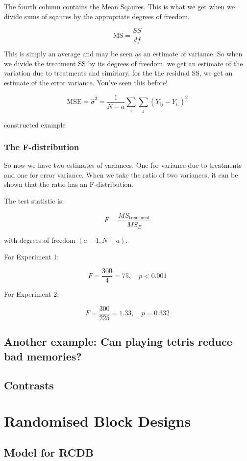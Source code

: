 \documentclass[
  letterpaper,
  DIV=11,
  numbers=noendperiod,
  oneside]{scrreprt}
\begin{document}
The fourth column contains the Mean Sqaures. This is what we get when we
divide sums of sqaures by the appropriate degrees of freedom.

\[ \text{MS} = \frac{SS}{df}\]

This is simply an average and may be seen as an estimate of variance. So
when we divide the treatment SS by its degrees of freedom, we get an
estimate of the variation due to treatments and simirlary, for the the
residual SS, we get an estimate of the error variance. You've seen this
before!

\[\text{MSE} = \hat{\sigma}^2 = \frac{1}{N-a}\sum_i\sum_j(Y_{ij} - Y_{i.})^2\]

constructed example

\section{The F-distribution}\label{the-f-distribution}

So now we have two estimates of variances. One for variance due to
treatments and one for error variance. When we take the ratio of two
variances, it can be shown that the ratio has an F-distribution.

The test statistic is:

\[
F = \frac{MS_{\text{treatment}}}{MS_E}
\]

with degrees of freedom \((a-1, N-a)\).

For Experiment 1:

\[
F = \frac{300}{4} = 75, \quad p < 0.001
\]

For Experiment 2:

\[
F = \frac{300}{225} = 1.33, \quad p = 0.332
\]

\chapter{Another example: Can playing tetris reduce bad
memories?}\label{another-example-can-playing-tetris-reduce-bad-memories}

\chapter{Contrasts}\label{contrasts}

\part{Randomised Block Designs}

\chapter{Model for RCDB}\label{model-for-rcdb}
\end{document}

